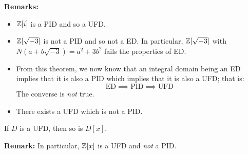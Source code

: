\documentclass[letterpaper]{article}
\begin{document}
\textbf{Remarks:}
\begin{itemize}
    \item $\mathbb{Z}[i]$ is a PID and so a UFD.
    \item $\mathbb{Z}[\sqrt{-3}]$ is not a PID and so not a ED. In particular, $\mathbb{Z}[\sqrt{-3}]$ with $N(a + b\sqrt{-3}) = a^2 + 3b^2$ fails the properties of ED. 
    \item From this theorem, we now know that an integral domain being an ED implies that it is also a PID which implies that it is also a UFD; that is: 
    \[\text{ED} \implies \text{PID} \implies \text{UFD}\]
    The converse is \emph{not} true. 
    \item There exists a UFD which is not a PID. 
\end{itemize}

\begin{theorem}{}{}
    If $D$ is a UFD, then so is $D[x]$. 
\end{theorem}
\textbf{Remark:} In particular, $\mathbb{Z}[x]$ is a UFD and \emph{not} a PID. 
\end{document}
